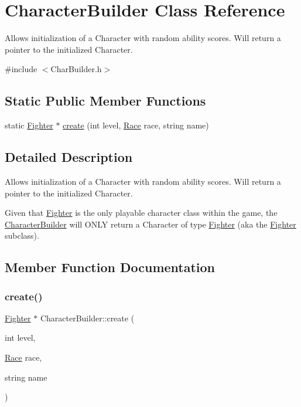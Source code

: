 \hypertarget{class_character_builder}{}\section{Character\+Builder Class Reference}
\label{class_character_builder}


Allows initialization of a Character with random ability scores. Will return a pointer to the initialized Character.  




{\ttfamily \#include $<$Char\+Builder.\+h$>$}

\subsection*{Static Public Member Functions}
\begin{DoxyCompactItemize}
\item 
static \hyperlink{class_fighter}{Fighter} $\ast$ \hyperlink{class_character_builder_aeb0a9728d5d20ea56efca5e9f633516f}{create} (int level, \hyperlink{_entity_8h_aa2df4028f474807638d438104900b003}{Race} race, string name)
\end{DoxyCompactItemize}


\subsection{Detailed Description}
Allows initialization of a Character with random ability scores. Will return a pointer to the initialized Character. 

Given that \hyperlink{class_fighter}{Fighter} is the only playable \textquotesingle{}character class\textquotesingle{} within the game, the \hyperlink{class_character_builder}{Character\+Builder} will O\+N\+LY return a Character of type \hyperlink{class_fighter}{Fighter} (aka the \hyperlink{class_fighter}{Fighter} subclass). 

\subsection{Member Function Documentation}
\hypertarget{class_character_builder_aeb0a9728d5d20ea56efca5e9f633516f}{}\label{class_character_builder_aeb0a9728d5d20ea56efca5e9f633516f} 
\subsubsection{\texorpdfstring{create()}{create()}}
{\footnotesize\ttfamily \hyperlink{class_fighter}{Fighter} $\ast$ Character\+Builder\+::create (\begin{DoxyParamCaption}\item[{int}]{level,  }\item[{\hyperlink{_entity_8h_aa2df4028f474807638d438104900b003}{Race}}]{race,  }\item[{string}]{name }\end{DoxyParamCaption})\hspace{0.3cm}{\ttfamily [static]}}


